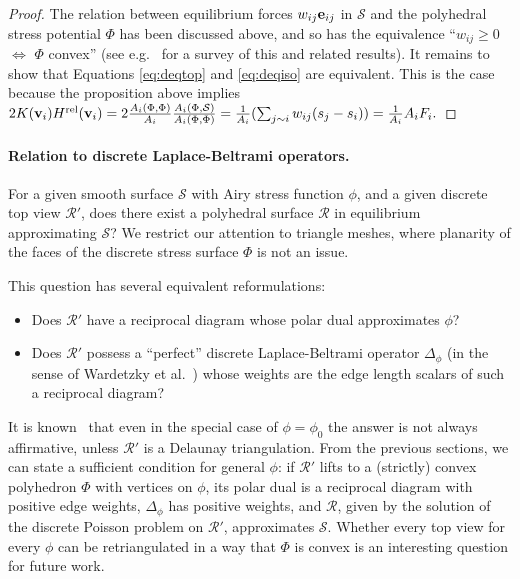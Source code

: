 \documentclass[annual]{acmsiggraph}
\def\rel{{\mathord{\text{\rm rel}}}}
\def\SS{{\mathcal S}}
\def\RR{{\mathcal R}}
\begin{document}
\begin{proof} The relation between equilibrium forces $w_{ij}{\mathbf e}_{ij}$ in 
$\SS$ and the polyhedral stress potential $\Phi$ has been discussed above, 
and so has the equivalence ``$w_{ij}\ge 0$ $\iff$ $\Phi$ convex'' (see 
e.g.\ \cite{Ash1988} for a survey of this and related results). It remains 
to show that Equations \eqref{eq:deqtop} and \eqref{eq:deqiso} are 
equivalent. This is the case because the proposition above implies
	$
	2 K(\vw_i) H^\rel(\vw_i) = 
	2 \frac{A_i(\Phi,\Phi)}{A_i}
	\frac{A_i(\Phi,\SS)}{A_i(\Phi,\Phi)} = 
	{1\over A_i}
	(\sum_{j\sim i} w_{ij} (s_j-s_i))
	= {1\over A_i} A_i F_i.
	$
	\end{proof}
\paragraph{Relation to discrete Laplace-Beltrami operators.}
For a given smooth surface $\SS$ with Airy stress function $\phi$, and a given 
discrete top view $\RR'$, does there exist a polyhedral surface $\RR$ in equilibrium
approximating $\SS$? We restrict our attention to triangle meshes, where planarity of the faces
of the discrete stress surface $\Phi$ is not an issue.

This question has several equivalent reformulations:
\begin{itemize}
\item Does $\RR'$ have a reciprocal diagram whose polar dual approximates $\phi$?
\item Does $\RR'$ possess a ``perfect'' discrete Laplace-Beltrami operator $\Delta_\phi$ (in the sense of Wardetzky et al.~)
whose weights are the edge length scalars of such a reciprocal diagram?
\end{itemize}
It is known~\cite{wardetzky07} that even in the special case of $\phi=\phi_0$ the answer is not always affirmative, unless
$\RR'$ is a Delaunay triangulation. From the previous sections, we can state a sufficient condition for general $\phi$: if
$\RR'$ lifts to a (strictly) convex polyhedron $\Phi$ with vertices on $\phi$, its polar dual is a reciprocal diagram with positive edge weights,
$\Delta_\phi$ has positive weights, and $\RR$, given by the solution of the discrete Poisson problem on $\RR'$, approximates $\SS$.
Whether every top view for every $\phi$ can be retriangulated in a way that $\Phi$ is convex is an interesting question for future work.
\end{document}

